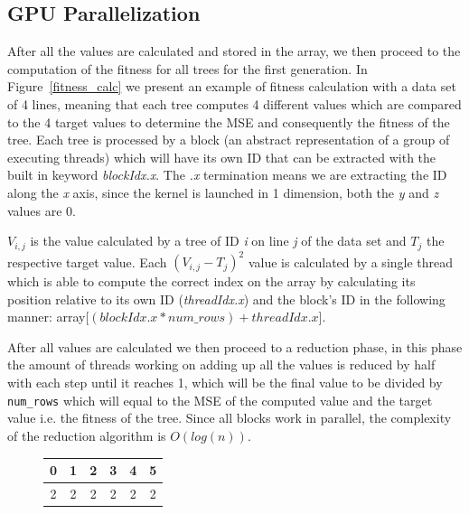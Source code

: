 \documentclass[runningheads]{llncs}
\begin{document}
\subsection{GPU Parallelization}
After all the values are calculated and stored in the array, we then proceed to the computation of the fitness for all trees for the first generation. In Figure~\ref{fitness_calc} we present an example of fitness calculation with a data set of 4 lines, meaning that each tree computes 4 different values which are compared to the 4 target values to determine the MSE and consequently the fitness of the tree. Each tree is processed by a block (an abstract representation of a group of executing threads) which will have its own ID that can be extracted with the built in keyword \textit{blockIdx.x}. The \textit{.x} termination means we are extracting the ID along the \textit{x} axis, since the kernel is launched in 1 dimension, both the \textit{y} and \textit{z} values are 0.

$V_{i,j}$ is the value calculated by a tree of ID \textit{i} on line \textit{j} of the data set and $T_{j}$ the respective target value. Each $(V_{i,j} - T_{j})^{2}$ value is calculated by a single thread which is able to compute the correct index on the array by calculating its position relative to its own ID (\textit{threadIdx.x}) and the block's ID in the following manner: array[$(blockIdx.x * num\_rows) + threadIdx.x$].

After all values are calculated we then proceed to a reduction phase, in this phase the amount of threads working on adding up all the values is reduced by half with each step until it reaches 1, which will be the final value to be divided by \texttt{num\_rows} which will equal to the MSE of the computed value and the target value i.e. the fitness of the tree. Since all blocks work in parallel, the complexity of the reduction algorithm is $O(log(n))$.

\begin{figure}[!htb]
\begin{center}
 \begin{tabular}{|c|c|c|c|c|c|}
 \hline
 0 & 1 & 2 & 3 & 4 & 5\\
 \hline
 2 & 2 & 2 & 2 & 2 & 2\\
 \hline
\end{tabular}
\end{center}
\end{figure}
\end{document}
